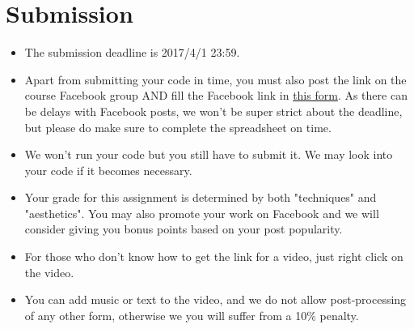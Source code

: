 \documentclass[12pt,a4paper]{article}
\begin{document}
\section{Submission}
\begin{itemize}
\item The submission deadline is 2017/4/1 23:59.
\item Apart from submitting your code in time,
you must also post the link on the course Facebook group
{\color{red}AND} fill the Facebook link in
\href{https://goo.gl/forms/YmmVGLD7qKK5slC83}{this form}.
As there can be delays with Facebook posts, we won't be super strict about the deadline, but please do make sure to complete the spreadsheet on time.
\item We won't run your code but you still have to submit it. We may look into your code if it becomes necessary.
\item Your grade for this assignment is determined by both "techniques" and "aesthetics". You may also promote your work on Facebook and we will consider giving you bonus points based on your post popularity.
\item For those who don't know how to get the link for a video, just right click on the video.
\item You can add music or text to the video, and we do not allow post-processing of any other form, otherwise we you will suffer from a 10\% penalty.
\end{itemize}
\end{document}
